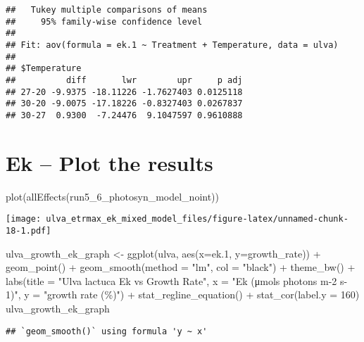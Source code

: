 \documentclass[
]{article}
\newenvironment{Shaded}{\begin{snugshade}}{\end{snugshade}}
\newcommand{\AttributeTok}[1]{\textcolor[rgb]{0.77,0.63,0.00}{#1}}
\newcommand{\DecValTok}[1]{\textcolor[rgb]{0.00,0.00,0.81}{#1}}
\newcommand{\FloatTok}[1]{\textcolor[rgb]{0.00,0.00,0.81}{#1}}
\newcommand{\FunctionTok}[1]{\textcolor[rgb]{0.00,0.00,0.00}{#1}}
\newcommand{\NormalTok}[1]{#1}
\newcommand{\OtherTok}[1]{\textcolor[rgb]{0.56,0.35,0.01}{#1}}
\newcommand{\SpecialCharTok}[1]{\textcolor[rgb]{0.00,0.00,0.00}{#1}}
\newcommand{\StringTok}[1]{\textcolor[rgb]{0.31,0.60,0.02}{#1}}
\begin{document}
\begin{verbatim}
##   Tukey multiple comparisons of means
##     95% family-wise confidence level
## 
## Fit: aov(formula = ek.1 ~ Treatment + Temperature, data = ulva)
## 
## $Temperature
##          diff       lwr        upr     p adj
## 27-20 -9.9375 -18.11226 -1.7627403 0.0125118
## 30-20 -9.0075 -17.18226 -0.8327403 0.0267837
## 30-27  0.9300  -7.24476  9.1047597 0.9610888
\end{verbatim}

\hypertarget{ek-plot-the-results}{%
\section{Ek -- Plot the results}\label{ek-plot-the-results}}

\begin{Shaded}
\begin{Highlighting}[]
\FunctionTok{plot}\NormalTok{(}\FunctionTok{allEffects}\NormalTok{(run5\_6\_photosyn\_model\_noint))}
\end{Highlighting}
\end{Shaded}

\texttt{[image: ulva\_etrmax\_ek\_mixed\_model\_files/figure-latex/unnamed-chunk-18-1.pdf]}

\begin{Shaded}
\begin{Highlighting}[]
\NormalTok{ulva\_growth\_ek\_graph }\OtherTok{\textless{}{-}} \FunctionTok{ggplot}\NormalTok{(ulva, }\FunctionTok{aes}\NormalTok{(}\AttributeTok{x=}\NormalTok{ek}\FloatTok{.1}\NormalTok{, }\AttributeTok{y=}\NormalTok{growth\_rate)) }\SpecialCharTok{+} \FunctionTok{geom\_point}\NormalTok{() }\SpecialCharTok{+} 
  \FunctionTok{geom\_smooth}\NormalTok{(}\AttributeTok{method =} \StringTok{"lm"}\NormalTok{, }\AttributeTok{col =} \StringTok{"black"}\NormalTok{) }\SpecialCharTok{+} \FunctionTok{theme\_bw}\NormalTok{() }\SpecialCharTok{+} 
  \FunctionTok{labs}\NormalTok{(}\AttributeTok{title =} \StringTok{"Ulva lactuca Ek vs Growth Rate"}\NormalTok{, }\AttributeTok{x =} \StringTok{"Ek (μmols photons m{-}2 s{-}1)"}\NormalTok{, }\AttributeTok{y =} \StringTok{"growth rate (\%)"}\NormalTok{) }\SpecialCharTok{+} 
  \FunctionTok{stat\_regline\_equation}\NormalTok{() }\SpecialCharTok{+} \FunctionTok{stat\_cor}\NormalTok{(}\AttributeTok{label.y =} \DecValTok{160}\NormalTok{)}
\NormalTok{ulva\_growth\_ek\_graph}
\end{Highlighting}
\end{Shaded}

\begin{verbatim}
## `geom_smooth()` using formula 'y ~ x'
\end{verbatim}
\end{document}
